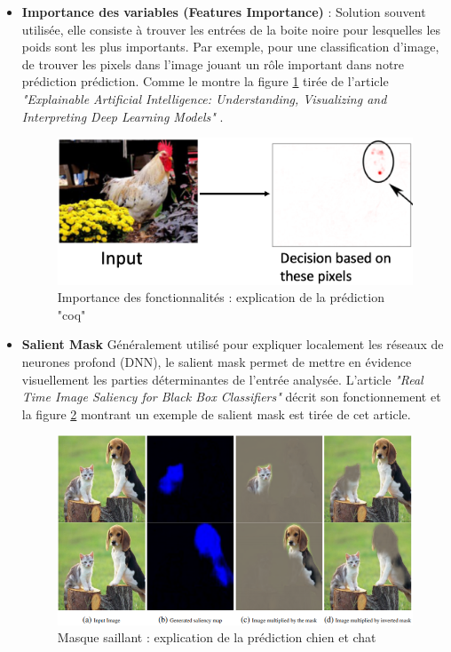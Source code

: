 \begin{itemize}
    \item \textbf{Importance des variables (Features Importance)} : Solution souvent utilisée, elle consiste à trouver les entrées de la boite noire pour lesquelles les poids sont les plus importants. Par exemple, pour une classification d'image, de trouver les pixels dans l'image jouant un rôle important dans notre prédiction prédiction. Comme le montre la figure \ref{chickenPixel} tirée de l'article \textit{"Explainable Artificial Intelligence: Understanding, Visualizing and Interpreting Deep Learning Models"} \cite{explainingIA}.\\
    \begin{figure}[h]
        \centering
        \includegraphics[scale=0.35]{src_img/chickenPixel.png}
        \caption{Importance des fonctionnalités : explication de la prédiction "coq"}
        \label{chickenPixel}
    \end{figure}
    
    \item \textbf{Salient Mask} Généralement utilisé pour expliquer localement les réseaux de neurones profond (DNN), le salient mask permet de mettre en évidence visuellement les parties déterminantes de l'entrée analysée. L'article \textit{"Real Time Image Saliency for Black Box Classifiers"}\cite{silentMask} décrit son fonctionnement et la figure \ref{silentMaskExemple} montrant un exemple de salient mask est tirée de cet article.
    \begin{figure}[h]
        \centering
        \includegraphics[scale=0.85]{src_img/silentMaskExemple.PNG}
        \caption{Masque saillant : explication de la prédiction chien et chat}
        \label{silentMaskExemple}
    \end{figure}
    

\end{itemize}
